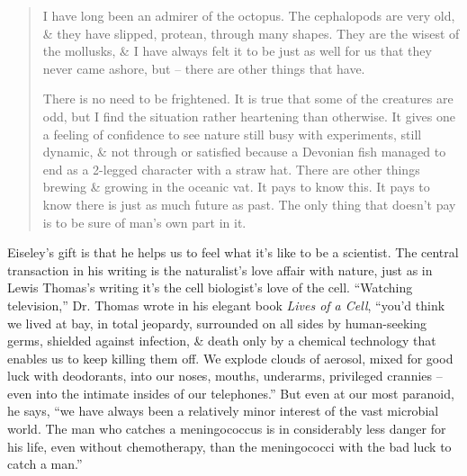 \documentclass{article}
\begin{document}
\begin{quotation}
	I have long been an admirer of the octopus. The cephalopods are very old, \& they have slipped, protean, through many shapes. They are the wisest of the mollusks, \& I have always felt it to be just as well for us that they never came ashore, but -- there are other things that have.
	
	There is no need to be frightened. It is true that some of the creatures are odd, but I find the situation rather heartening than otherwise. It gives one a feeling of confidence to see nature still busy with experiments, still dynamic, \& not through or satisfied because a Devonian fish managed to end as a 2-legged character with a straw hat. There are other things brewing \& growing in the oceanic vat. It pays to know this. It pays to know there is just as much future as past. The only thing that doesn't pay is to be sure of man's own part in it.
\end{quotation}
Eiseley's gift is that he helps us to feel what it's like to be a scientist. The central transaction in his writing is the naturalist's love affair with nature, just as in Lewis Thomas's writing it's the cell biologist's love of the cell. ``Watching television,'' Dr. Thomas wrote in his elegant book \textit{Lives of a Cell}, ``you'd think we lived at bay, in total jeopardy, surrounded on all sides by human-seeking germs, shielded against infection, \& death only by a chemical technology that enables us to keep killing them off. We explode clouds of aerosol, mixed for good luck with deodorants, into our noses, mouths, underarms, privileged crannies -- even into the intimate insides of our telephones.'' But even at our most paranoid, he says, ``we have always been a relatively minor interest of the vast microbial world. The man who catches a meningococcus is in considerably less danger for his life, even without chemotherapy, than the meningococci with the bad luck to catch a man.''
\end{document}
